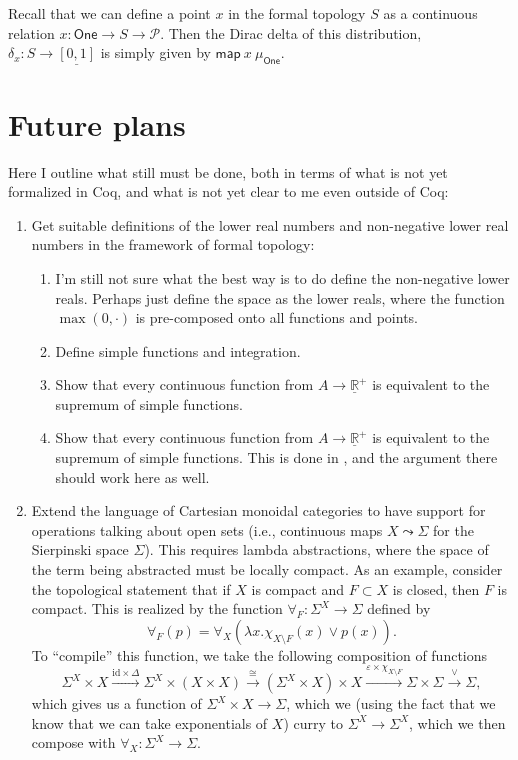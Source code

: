 \documentclass{article}           %
\newcommand{\Prop}{\mathcal{P}}
\newcommand{\map}[2]{\mathsf{map}\ {#1}\ {#2}}
\newcommand{\One}{\mathsf{One}}
\begin{document}
Recall that we can define a point $x$ in the formal topology $S$ as a continuous relation $x : \One \to S \to \Prop$. Then the Dirac delta of this distribution, $\delta_x : S \to \underline{[0,1]}$ is simply given by $\map{x}{\mu_\One}$.

\section{Future plans}

Here I outline what still must be done, both in terms of what is not yet formalized in Coq, and what is not yet clear to me even outside of Coq:

\begin{enumerate}
\item Get suitable definitions of the lower real numbers and non-negative lower real numbers in the framework of formal topology:
\begin{enumerate}
  \item I'm still not sure what the best way is to do define the non-negative lower reals. Perhaps just define the space as the lower reals, where the function $\max(0, \cdot)$ is pre-composed onto all functions and points.
  \item Define simple functions and integration.
  \item Show that every continuous function from $A \to \underline{\mathbb{R}}^+$ is equivalent to the supremum of simple functions.
  \item Show that every continuous function from $A \to \underline{\mathbb{R}}^+$ is equivalent to the supremum of simple functions. This is done in \cite{jones1990}, and the argument there should work here as well.
\end{enumerate}

\item Extend the language of Cartesian monoidal categories to have support for operations talking about open sets (i.e., continuous maps $X \leadsto \Sigma$ for the Sierpinski space $\Sigma$). This requires lambda abstractions, where the space of the term being abstracted must be locally compact.
As an example, consider the topological statement that if $X$ is compact and $F \subset X$ is closed, then $F$ is compact\cite{escardo2004}. This is realized by the function $\forall_F : \Sigma^X \to \Sigma$ defined by
\[
\forall_F(p) = \forall_X(\lambda x. \chi_{X \setminus F}(x) \vee p(x)).
\]
To ``compile'' this function, we take the following composition of functions
\[
\Sigma^X \times X
\xrightarrow{\mathrm{id} \times \Delta}
\Sigma^X \times (X \times X)
\xrightarrow{\cong}
(\Sigma^X \times X) \times X
\xrightarrow{\varepsilon \times \chi_{X \setminus F}}
\Sigma \times \Sigma
\xrightarrow{\vee}
\Sigma,
\]
which gives us a function of $\Sigma^X \times X \to \Sigma$, which we (using the fact that we know that we can take exponentials of $X$) curry to $\Sigma^X \to \Sigma^X$, which we then compose with $\forall_X : \Sigma^X \to \Sigma$.


\end{enumerate}
\end{document}
